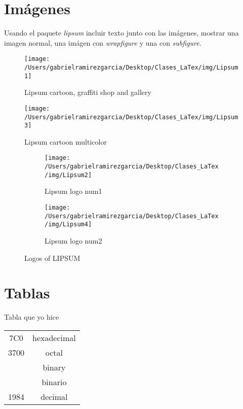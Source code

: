 \documentclass[12pt]{article}
\begin{document}
	
	\section{Imágenes}
	Usando el paquete \textit{lipsum} incluir texto junto con las imágenes, mostrar una imagen normal, una imágen con \textit{wrapfigure} y una con \textit{subfigure}. 
	
		\begin{figure}[h] 
			\centering
			\texttt{[image: /Users/gabrielramirezgarcia/Desktop/Clases\_LaTex/img/Lipsum1]}
			\caption{Lipsum cartoon, graffiti shop and gallery}
		\end{figure}
		\lipsum
	
		\newpage
		\begin{wrapfigure}[10] {l} [-6 mm]{0.5\textwidth} 
			\centering
			\texttt{[image: /Users/gabrielramirezgarcia/Desktop/Clases\_LaTex/img/Lipsum3]}
			\caption{Lipsum cartoon multicolor}
		\end{wrapfigure}
		\lipsum
		
		\newpage
		\lipsum[1-3]
		\begin{figure}[ht]
			\centering
			\begin{subfigure} [b]{0.4\textwidth}
				\texttt{[image: /Users/gabrielramirezgarcia/Desktop/Clases\_LaTex/img/Lipsum2]}
				\caption{Lipsum logo num1}
			\end{subfigure}
			\hspace{15mm}
			\begin{subfigure} [b]{0.26\textwidth}
					\texttt{[image: /Users/gabrielramirezgarcia/Desktop/Clases\_LaTex/img/Lipsum4]}
				\caption{Lipsum logo num2}
			\end{subfigure}
			\caption{Logos of LIPSUM}
		\end{figure}
		\lipsum[4-6]
		
		
	\section{Tablas}
	Tabla que yo hice 
		\begin{table}[th]
			\centering
			\begin{tabular}{|c|c|}  \hline
				7C0                  &  hexadecimal  \\
				3700                &  octal  \\ \hhline{~-} 
				\multirow{2}{*}{111111000000}  &  binary \\  \cmidrule(lr){2-2}  &  binario \\ \hline\hline
				1984                 &  decimal  \\	\hline
			\end{tabular}
		\end{table}
			
\end{document}
